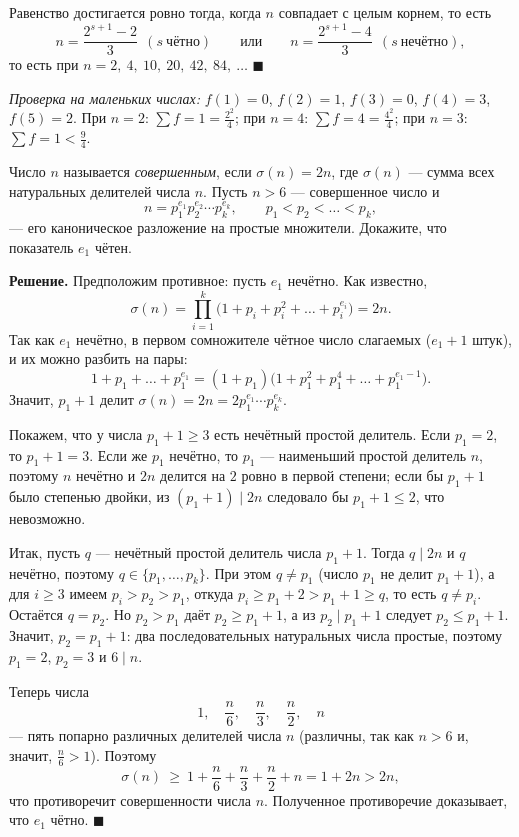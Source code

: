 Равенство достигается ровно тогда, когда $n$ совпадает с целым корнем, то есть
\[
n=\frac{2^{s+1}-2}{3}\ \ (s\ \text{чётно})\qquad\text{или}\qquad n=\frac{2^{s+1}-4}{3}\ \ (s\ \text{нечётно}),
\]
то есть при $n=2,\ 4,\ 10,\ 20,\ 42,\ 84,\ \ldots$ \hfill$\blacksquare$

\emph{Проверка на маленьких числах:} $f(1)=0$, $f(2)=1$, $f(3)=0$, $f(4)=3$, $f(5)=2$. При $n=2$: $\sum f=1=\frac{2^2}{4}$; при $n=4$: $\sum f=4=\frac{4^2}{4}$; при $n=3$: $\sum f=1<\frac94$.
\fi

\q Число $n$ называется \emph{совершенным}, если $\sigma(n)=2n$, где $\sigma(n)$ --- сумма всех натуральных делителей числа $n$. Пусть $n>6$ --- совершенное число и
\[
n=p_1^{e_1}p_2^{e_2}\cdots p_k^{e_k},\qquad p_1<p_2<\dots<p_k,
\]
--- его каноническое разложение на простые множители. Докажите, что показатель $e_1$ чётен.

\if{}
\textbf{Решение.} Предположим противное: пусть $e_1$ нечётно. Как известно,
\[
\sigma(n)=\prod_{i=1}^{k}\bigl(1+p_i+p_i^2+\dots+p_i^{e_i}\bigr)=2n .
\]
Так как $e_1$ нечётно, в первом сомножителе чётное число слагаемых ($e_1+1$ штук), и их можно разбить на пары:
\[
1+p_1+\dots+p_1^{e_1}=(1+p_1)\bigl(1+p_1^2+p_1^4+\dots+p_1^{e_1-1}\bigr).
\]
Значит, $p_1+1$ делит $\sigma(n)=2n=2p_1^{e_1}\cdots p_k^{e_k}$.

Покажем, что у числа $p_1+1\ge3$ есть нечётный простой делитель. Если $p_1=2$, то $p_1+1=3$. Если же $p_1$ нечётно, то $p_1$ --- наименьший простой делитель $n$, поэтому $n$ нечётно и $2n$ делится на $2$ ровно в первой степени; если бы $p_1+1$ было степенью двойки, из $(p_1+1)\mid 2n$ следовало бы $p_1+1\le2$, что невозможно.

Итак, пусть $q$ --- нечётный простой делитель числа $p_1+1$. Тогда $q\mid 2n$ и $q$ нечётно, поэтому $q\in\{p_1,\dots,p_k\}$. При этом $q\ne p_1$ (число $p_1$ не делит $p_1+1$), а для $i\ge3$ имеем $p_i>p_2>p_1$, откуда $p_i\ge p_1+2>p_1+1\ge q$, то есть $q\ne p_i$. Остаётся $q=p_2$. Но $p_2>p_1$ даёт $p_2\ge p_1+1$, а из $p_2\mid p_1+1$ следует $p_2\le p_1+1$. Значит, $p_2=p_1+1$: два последовательных натуральных числа простые, поэтому $p_1=2$, $p_2=3$ и $6\mid n$.

Теперь числа
\[
1,\quad \frac n6,\quad \frac n3,\quad \frac n2,\quad n
\]
--- пять попарно различных делителей числа $n$ (различны, так как $n>6$ и, значит, $\frac n6>1$). Поэтому
\[
\sigma(n)\ \ge\ 1+\frac n6+\frac n3+\frac n2+n=1+2n>2n,
\]
что противоречит совершенности числа $n$. Полученное противоречие доказывает, что $e_1$ чётно. \hfill$\blacksquare$
\fi

